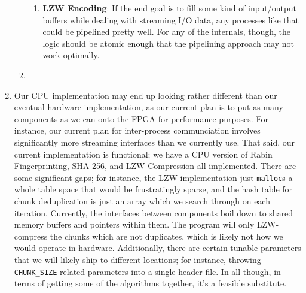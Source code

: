 \documentclass{article}
\begin{document}
\begin{enumerate}
\begin{enumerate}[label=(\alph*)]
\begin{enumerate}[label=(\roman*)]
\item%
\textbf{LZW Encoding}:\newline
If the end goal is to fill some kind of input/output buffers while dealing with streaming I/O data, any processes like that could be pipelined pretty well. For any of the internals, though, the logic should be atomic enough that the pipelining approach may not work optimally.

\end{enumerate}%

\item%

\end{enumerate}%

\item%
Our CPU implementation may end up looking rather different than our eventual hardware implementation, as our current plan is to put as many components as we can onto the FPGA for performance purposes. For instance, our current plan for inter-process communciation involves significantly more streaming interfaces than we currently use.\newline\newline
That said, our current implementation is functional; we have a CPU version of Rabin Fingerprinting, SHA-256, and LZW Compression all implemented. There are some significant gaps; for instance, the LZW implementation just \texttt{malloc}s a whole table space that would be frustratingly sparse, and the hash table for chunk deduplication is just an array which we search through on each iteration.\newline\newline
Currently, the interfaces between components boil down to shared memory buffers and pointers within them. The program will only LZW-compress the chunks which are not duplicates, which is likely not how we would operate in hardware. Additionally, there are certain tunable parameters that we will likely ship to different locations; for instance, throwing \texttt{CHUNK\_SIZE}-related parameters into a single header file.\newline\newline
In all though, in terms of getting some of the algorithms together, it's a feasible substitute.

\end{enumerate}%
\end{document}
